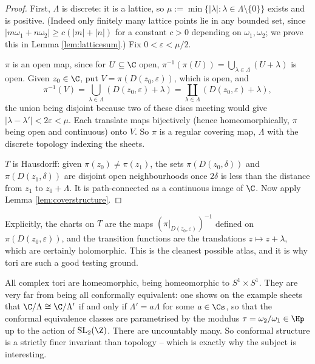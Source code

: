 \begin{proof}
	First, $\Lambda$ is discrete: it is a lattice, so $\mu := \min\{|\lambda| : \lambda \in
	\Lambda \setminus \{0\}\}$ exists and is positive. (Indeed only finitely many lattice
	points lie in any bounded set, since $|m\omega_1 + n\omega_2| \geq c(|m| + |n|)$ for a
	constant $c > 0$ depending on $\omega_1, \omega_2$; we prove this in Lemma
	\ref{lem:latticesum}.) Fix $0 < \varepsilon < \mu/2$.

	$\pi$ is an open map, since for $U \subseteq \C$ open,
	$\pi^{-1}(\pi(U)) = \bigcup_{\lambda \in \Lambda}(U + \lambda)$ is open. Given
	$z_0 \in \C$, put $V = \pi(D(z_0,\varepsilon))$, which is open, and
	$$
	\pi^{-1}(V) = \bigcup_{\lambda\in\Lambda} (D(z_0,\varepsilon) + \lambda)
	= \coprod_{\lambda \in \Lambda} (D(z_0,\varepsilon)+\lambda),
	$$
	the union being disjoint because two of these discs meeting would give
	$|\lambda - \lambda'| < 2\varepsilon < \mu$. Each translate maps bijectively
	(hence homeomorphically, $\pi$ being open and continuous) onto $V$. So $\pi$ is a
	regular covering map, $\Lambda$ with the discrete topology indexing the sheets.

	$T$ is Hausdorff: given $\pi(z_0) \neq \pi(z_1)$, the sets $\pi(D(z_0,\delta))$ and
	$\pi(D(z_1,\delta))$ are disjoint open neighbourhoods once $2\delta$ is less than the
	distance from $z_1$ to $z_0 + \Lambda$. It is path-connected as a continuous image of
	$\C$. Now apply Lemma \ref{lem:coverstructure}.
\end{proof}

Explicitly, the charts on $T$ are the maps $(\pi|_{D(z_0,\varepsilon)})^{-1}$ defined on
$\pi(D(z_0,\varepsilon))$, and the transition functions are the translations
$z \mapsto z + \lambda$, which are certainly holomorphic. This is the cleanest possible
atlas, and it is why tori are such a good testing ground.

\begin{remark}
	All complex tori are homeomorphic, being homeomorphic to $S^1 \times S^1$. They are
	very far from being all conformally equivalent: one shows on the example sheets that
	$\C/\Lambda \cong \C/\Lambda'$ if and only if $\Lambda' = a\Lambda$ for some
	$a \in \Cs$, so that the conformal equivalence classes are parametrised by the modulus
	$\tau = \omega_2/\omega_1 \in \Hp$ up to the action of $\operatorname{SL}_2(\Z)$. There
	are uncountably many. So conformal structure is a strictly finer invariant than
	topology -- which is exactly why the subject is interesting.
\end{remark}

